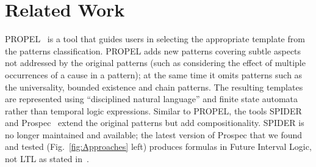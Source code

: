 \documentclass[letter]{llncs}
\begin{document}
\section{Related Work}
\vspace{-7 pt}

\label{sec:RelatedWork}
PROPEL~\cite{Smith02propel:an} is a tool that
guides users in selecting the appropriate template from the patterns
classification. PROPEL adds new patterns covering subtle aspects
not addressed by the original patterns (such as considering the effect
of multiple occurrences of a cause in a pattern); at the same time it
omits patterns such as the universality, bounded
existence and chain patterns. The resulting templates are represented
using ``disciplined natural language'' and finite state automata rather
than temporal logic expressions.
%
Similar to PROPEL, the tools SPIDER~\cite{konrad2005facilitating}
and Prospec~\cite{Mondragon_prospec} extend the original patterns but
add compositionality.  SPIDER is no longer maintained and
available; the latest version of Prospec that we found and tested
(Fig.~\ref{fig:Approaches} left) produces formulas in Future Interval
Logic, not LTL as stated in~\cite{Mondragon_prospec}.
\end{document}
